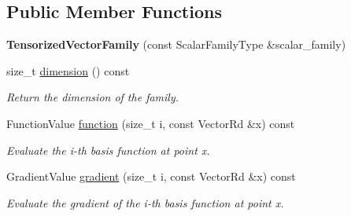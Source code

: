\subsection*{Public Member Functions}
\begin{DoxyCompactItemize}
\item 
\mbox{\label{classHArDCore3D_1_1TensorizedVectorFamily_a2f34ec8677412c819a7a49b91401c70f}} 
{\bfseries Tensorized\+Vector\+Family} (const Scalar\+Family\+Type \&scalar\+\_\+family)
\item 
\mbox{\label{classHArDCore3D_1_1TensorizedVectorFamily_a1f8e17599e9b38b58ef247317783c51f}} 
size\+\_\+t \hyperlink{classHArDCore3D_1_1TensorizedVectorFamily_a1f8e17599e9b38b58ef247317783c51f}{dimension} () const
\begin{DoxyCompactList}\small\item\em Return the dimension of the family. \end{DoxyCompactList}\item 
\mbox{\label{classHArDCore3D_1_1TensorizedVectorFamily_ac34ef60810b5d9641458c640bb66b3b4}} 
Function\+Value \hyperlink{classHArDCore3D_1_1TensorizedVectorFamily_ac34ef60810b5d9641458c640bb66b3b4}{function} (size\+\_\+t i, const Vector\+Rd \&x) const
\begin{DoxyCompactList}\small\item\em Evaluate the i-\/th basis function at point x. \end{DoxyCompactList}\item 
\mbox{\label{classHArDCore3D_1_1TensorizedVectorFamily_a42238c95ed27a327d0291c67a1c6196b}} 
Gradient\+Value \hyperlink{classHArDCore3D_1_1TensorizedVectorFamily_a42238c95ed27a327d0291c67a1c6196b}{gradient} (size\+\_\+t i, const Vector\+Rd \&x) const
\begin{DoxyCompactList}\small\item\em Evaluate the gradient of the i-\/th basis function at point x. \end{DoxyCompactList}\item 
\mbox{\label{classHArDCore3D_1_1TensorizedVectorFamily_a2ed39faecc4dbb67d0ec8125f9a61366}} 

\end{DoxyCompactItemize}
